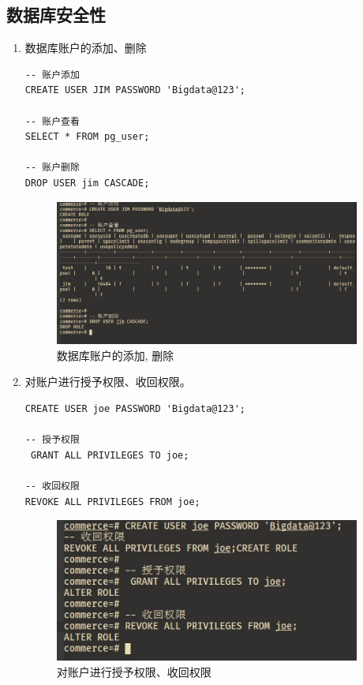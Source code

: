 \subsection{数据库安全性}
\begin{enumerate}
  \item 数据库账户的添加、删除
\begin{center}
\begin{verbatim}
-- 账户添加
CREATE USER JIM PASSWORD 'Bigdata@123';

-- 账户查看
SELECT * FROM pg_user;

-- 账户删除
DROP USER jim CASCADE;
\end{verbatim}
\end{center}
\begin{figure}[H]
  \begin{center}
    \includegraphics[width=0.95\textwidth]{./figures/account_management.jpg}
  \end{center}
  \caption{数据库账户的添加, 删除}
\end{figure}
  \item 对账户进行授予权限、收回权限。
\begin{center}
\begin{verbatim}
CREATE USER joe PASSWORD 'Bigdata@123';

-- 授予权限
 GRANT ALL PRIVILEGES TO joe;

-- 收回权限
REVOKE ALL PRIVILEGES FROM joe;
\end{verbatim}
\end{center}
\begin{figure}[H]
  \begin{center}
    \includegraphics[width=0.95\textwidth]{./figures/account_perm.jpg}
  \end{center}
  \caption{对账户进行授予权限、收回权限}
\end{figure}
\end{enumerate}

